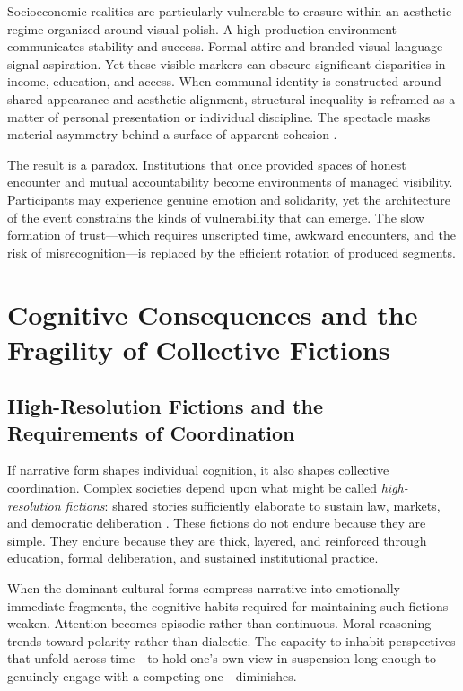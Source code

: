 \documentclass[12pt]{article}
\begin{document}
Socioeconomic realities are particularly vulnerable to erasure within an aesthetic regime organized around visual polish. A high-production environment communicates stability and success. Formal attire and branded visual language signal aspiration. Yet these visible markers can obscure significant disparities in income, education, and access. When communal identity is constructed around shared appearance and aesthetic alignment, structural inequality is reframed as a matter of personal presentation or individual discipline. The spectacle masks material asymmetry behind a surface of apparent cohesion \citep{Bourdieu1984}.

The result is a paradox. Institutions that once provided spaces of honest encounter and mutual accountability become environments of managed visibility. Participants may experience genuine emotion and solidarity, yet the architecture of the event constrains the kinds of vulnerability that can emerge. The slow formation of trust---which requires unscripted time, awkward encounters, and the risk of misrecognition---is replaced by the efficient rotation of produced segments.

\section{Cognitive Consequences and the Fragility of Collective Fictions}
\label{sec:cognitive}

\subsection{High-Resolution Fictions and the Requirements of Coordination}

If narrative form shapes individual cognition, it also shapes collective coordination. Complex societies depend upon what might be called \emph{high-resolution fictions}: shared stories sufficiently elaborate to sustain law, markets, and democratic deliberation \citep{Harari2015}. These fictions do not endure because they are simple. They endure because they are thick, layered, and reinforced through education, formal deliberation, and sustained institutional practice.

When the dominant cultural forms compress narrative into emotionally immediate fragments, the cognitive habits required for maintaining such fictions weaken. Attention becomes episodic rather than continuous. Moral reasoning trends toward polarity rather than dialectic. The capacity to inhabit perspectives that unfold across time---to hold one's own view in suspension long enough to genuinely engage with a competing one---diminishes.
\end{document}
